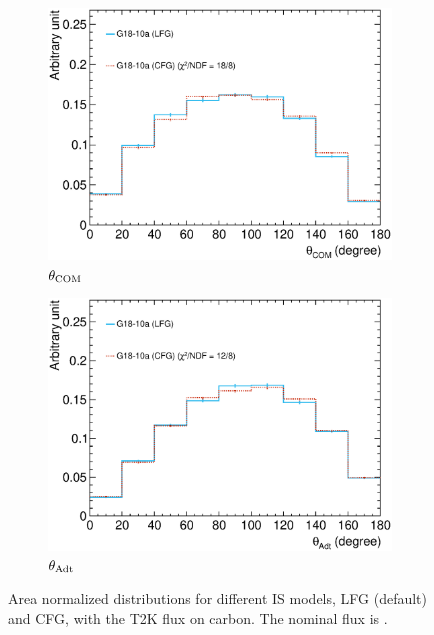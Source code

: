      \begin{figure}
     \centering
     \begin{subfigure}[b]{\dbfigwid\textwidth}
          \centering
          \includegraphics[width=\textwidth]{figures/COM/anorm-10a-9bin-_da_tan.eps}
          \caption{$\theta_{\textrm{COM}}$}
          \label{subfig:10alfg-comp-t2k}
     \end{subfigure}
     \begin{subfigure}[b]{\dbfigwid\textwidth}
          \centering
          \includegraphics[width=\textwidth]{figures/COM/anorm-10a-9bin-_adt.eps}
          \caption{$\theta_{\textrm{Adt}}$}
          \label{subfig:10alfg-comp-t2k-adt}
     \end{subfigure}
     \caption{Area normalized distributions for different IS models, LFG (default) and CFG, with the T2K flux on carbon. The nominal flux is \geta.}
     \label{fig:10a-comp-t2k}
     \end{figure}

